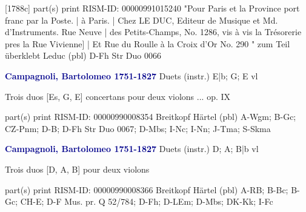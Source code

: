 \documentclass[twocolumn]{book}
\begin{document}
\newline \textcolor{darkblue}{}  [1788c]  part(s)  
\newline print
\newline RISM-ID: 00000991015240
\newline "Pour Paris et la Province port franc par la Poste. | à Paris. | Chez LE DUC, Editeur de Musique et Md. d'Instruments. Rue Neuve | des Petits-Champs, No. 1286, vis à vis la Trésorerie pres la Rue Vivienne] | Et Rue du Roulle à la Croix d'Or No. 290 " zum Teil überklebt
\newline Leduc  (pbl)
\newline D-Fh  Str Duo 0066
\newline \par \vspace{7pt} \textcolor{darkblue}{\textbf{Campagnoli, Bartolomeo  1751-1827}}
\newline Duets (instr.)  E|b; G; E  
 vl
\newline \begin{itshape}Trois duos [Es, G, E] concertans pour deux violons ... op. IX\end{itshape} 
\newline \textcolor{darkblue}{}  part(s)  
\newline print
\newline RISM-ID: 00000990008354
\newline Breitkopf  Härtel  (pbl)
\newline A-Wgm; B-Gc; CZ-Pnm; D-B; D-Fh  Str Duo 0067; D-Mbs; I-Nc; I-Nn; J-Tma; S-Skma
\newline \par \vspace{7pt} \textcolor{darkblue}{\textbf{Campagnoli, Bartolomeo  1751-1827}}
\newline Duets (instr.)  D; A; B|b  
 vl
\newline \begin{itshape}Trois duos [D, A, B] pour deux violons\end{itshape} 
\newline \textcolor{darkblue}{}  part(s)  
\newline print
\newline RISM-ID: 00000990008366
\newline Breitkopf  Härtel  (pbl)
\newline A-RB; B-Bc; B-Gc; CH-E; D-F  Mus. pr. Q 52/784; D-Fh; D-LEm; D-Mbs; DK-Kk; I-Fc
\end{document}
